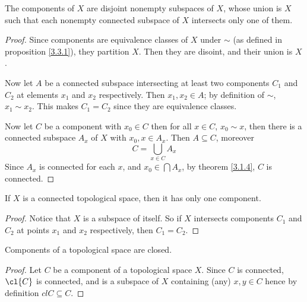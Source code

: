 \begin{theorem}\label{3.3.2}
    The components of $X$ are disjoint nonempty subspaces of  $X$, whose union is  $X$ such that
    each nonempty connected subspace of  $X$ intersects only one of them.
\end{theorem}
\begin{proof}
    Since components are equivalence classes of $X$ under $\sim$ (as defined in proposition
    \ref{3.3.1}), they partition $X$. Then they are disoint, and their union is $X$.

    Now let  $A$ be a connected subspace intersecting at least two components  $C_1$ and $C_2$ at
    elements $x_1$ and $ x_2$ respectively. Then $x_1,x_2 \in A$; by definition of $\sim$,  $x_1
    \sim x_2$. This makes $C_1=C_2$ since they are equivalence classes.

    Now let $C$ be a component with  $ x_0 \in C$ then for all $x \in C$, $ x_0 \sim x$, then there
    is a connected subspace $A_x$ of $X$ with  $x_0,x \in A_x$. Then $A \subseteq C$, moreover
        \begin{equation*}
            C=\bigcup_{x \in C}{A_x}
        \end{equation*}
    Since $A_x$ is connected for each  $x$, and  $ x_0 \in \bigcap{A_x}$, by theorem \ref{3.1.4},
    $C$ is connected.
\end{proof}
\begin{corollary}
    If $X$ is a connected topological space, then it has only one component.
\end{corollary}
\begin{proof}
    Notice that $X$ is a subspace of itself. So if $X$ intersects components  $C_1$ and $C_2$ at
    points  $x_1$ and  $x_2$ respectively, then $C_1=C_2$.
\end{proof}

\begin{lemma}\label{3.3.3}
    Components of a topological space are closed.
\end{lemma}
\begin{proof}
    Let $C$ be a component of a topological space  $X$. Since  $C$ is connected,  $\cl{C}$ is
    connected, and is a subspace of $X$ containing (any) $x,y \in C$ hence by definition $cl{C}
    \subseteq C$.
\end{proof}

